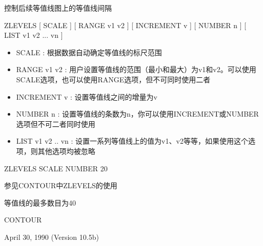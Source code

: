 \label{cmd:zlevels}

控制后续等值线图上的等值线间隔

ZLEVELS [ SCALE ] [ RANGE v1 v2 ] [ INCREMENT v ] [ NUMBER n ] [ LIST v1 v2 ... vn ]

\begin{itemize}
\item SCALE : 根据数据自动确定等值线的标尺范围 
\item RANGE v1 v2 : 用户设置等值线的范围（最小和最大）为v1和v2。可以使用SCALE选项，也可以使用RANGE选项，但不可同时使用二者 
\item INCREMENT v : 设置等值线之间的增量为v 
\item NUMBER n :  设置等值线的条数为n，你可以使用INCREMENT或NUMBER选项但不可二者同时使用 
\item LIST v1 v2 .. vn : 设置一系列等值线上的值为v1、v2等等，如果使用这个选项，则其他选项均被忽略 
\end{itemize}

ZLEVELS SCALE NUMBER 20

参见CONTOUR中ZLEVELS的使用

等值线的最多数目为40

CONTOUR

April 30, 1990 (Version 10.5b)
